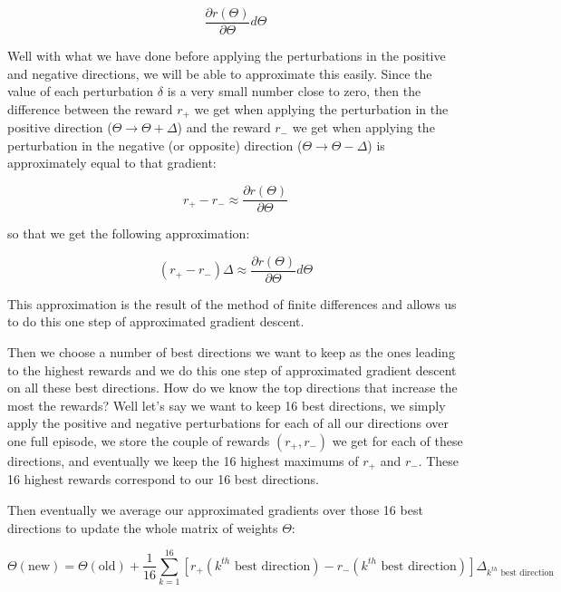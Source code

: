 \documentclass[]{book}
\begin{document}
\begin{equation*}
\frac{\partial r(\Theta)}{\partial \Theta} d \Theta
\end{equation*}

Well with what we have done before applying the perturbations in the positive and negative directions, we will be able to approximate this easily. Since the value of each perturbation \(\delta\) is a very small number close to zero, then the difference between the reward \(r_{+}\) we get when applying the perturbation in the positive direction (\(\Theta \rightarrow \Theta + \Delta\)) and the reward \(r_{-}\) we get when applying the perturbation in the negative (or opposite) direction (\(\Theta \rightarrow \Theta - \Delta\)) is approximately equal to that gradient:

\begin{equation*}
r_{+} - r_{-} \approx \frac{\partial r(\Theta)}{\partial \Theta}
\end{equation*}

so that we get the following approximation:

\begin{equation*}
(r_{+} - r_{-}) \Delta \approx \frac{\partial r(\Theta)}{\partial \Theta} d \Theta
\end{equation*}

This approximation is the result of the method of finite differences and allows us to do this one step of approximated gradient descent.

Then we choose a number of best directions we want to keep as the ones leading to the highest rewards and we do this one step of approximated gradient descent on all these best directions. How do we know the top directions that increase the most the rewards? Well let's say we want to keep 16 best directions, we simply apply the positive and negative perturbations for each of all our directions over one full episode, we store the couple of rewards \((r_{+}, r_{-})\) we get for each of these directions, and eventually we keep the 16 highest maximums of \(r_{+}\) and \(r_{-}\). These 16 highest rewards correspond to our 16 best directions.

Then eventually we average our approximated gradients over those 16 best directions to update the whole matrix of weights \(\Theta\):

\begin{equation}
\Theta(\textrm{new}) = \Theta(\textrm{old}) + \frac{1}{16}\sum_{k=1}^{16} [r_{+}(\textrm{$k^{th}$ best direction}) - r_{-}(\textrm{$k^{th}$ best direction})] \Delta_{\textrm{$k^{th}$ best direction}}
\end{equation}
\end{document}
